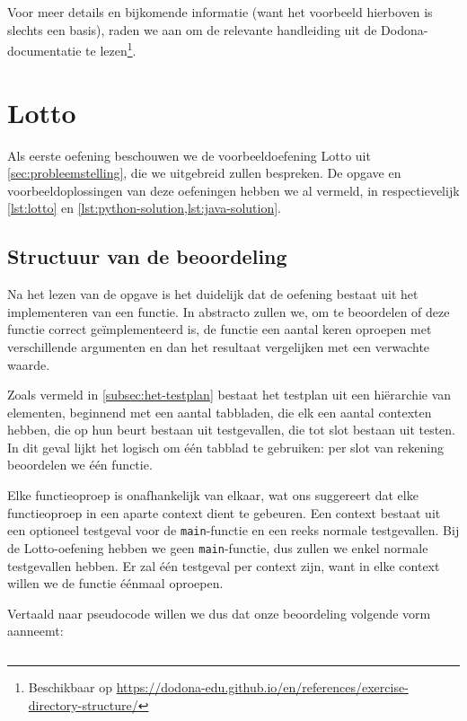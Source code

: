 Voor meer details en bijkomende informatie (want het voorbeeld hierboven is slechts een basis), raden we aan om de relevante handleiding uit de Dodona-documentatie te lezen\footnote{Beschikbaar op \url{https://dodona-edu.github.io/en/references/exercise-directory-structure/}}.

\section{Lotto}\label{sec:oefening-lotto}

Als eerste oefening beschouwen we de voorbeeldoefening Lotto uit \cref{sec:probleemstelling}, die we uitgebreid zullen bespreken.
De opgave en voorbeeldoplossingen van deze oefeningen hebben we al vermeld, in respectievelijk \cref{lst:lotto} en \cref{lst:python-solution,lst:java-solution}.

\subsection{Structuur van de beoordeling}\label{subsec:oefening-lotto-structuur}

Na het lezen van de opgave is het duidelijk dat de oefening bestaat uit het implementeren van een functie.
In abstracto zullen we, om te beoordelen of deze functie correct geïmplementeerd is, de functie een aantal keren oproepen met verschillende argumenten en dan het resultaat vergelijken met een verwachte waarde.

Zoals vermeld in \cref{subsec:het-testplan} bestaat het testplan uit een hiërarchie van elementen, beginnend met een aantal tabbladen, die elk een aantal contexten hebben, die op hun beurt bestaan uit testgevallen, die tot slot bestaan uit testen.
In dit geval lijkt het logisch om één tabblad te gebruiken: per slot van rekening beoordelen we één functie.

Elke functieoproep is onafhankelijk van elkaar, wat ons suggereert dat elke functieoproep in een aparte context dient te gebeuren.
Een context bestaat uit een optioneel testgeval voor de \texttt{main}-functie en een reeks normale testgevallen.
Bij de Lotto-oefening hebben we geen \texttt{main}-functie, dus zullen we enkel normale testgevallen hebben.
Er zal één testgeval per context zijn, want in elke context willen we de functie éénmaal oproepen.

Vertaald naar pseudocode willen we dus dat onze beoordeling volgende vorm aanneemt:

\inputminted{python}{code/lotto-eval.py}

